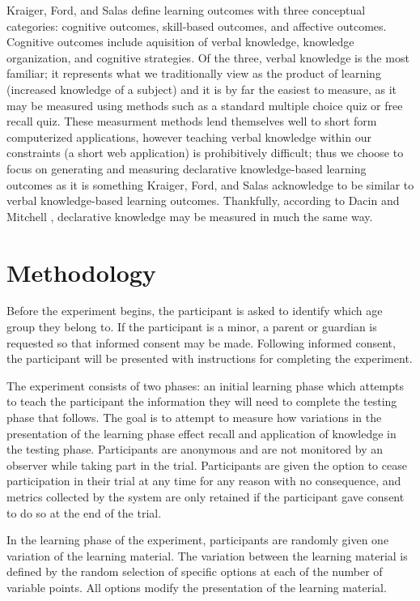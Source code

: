 \documentclass[12pt]{report}
\begin{document}
Kraiger, Ford, and Salas \cite{kraiger1993application} define learning outcomes with three conceptual categories: cognitive outcomes, skill-based outcomes, and affective outcomes. Cognitive outcomes include aquisition of verbal knowledge, knowledge organization, and cognitive strategies. Of the three, verbal knowledge is the most familiar; it represents what we traditionally view as the product of learning (increased knowledge of a subject) and it is by far the easiest to measure, as it may be measured using methods such as a standard multiple choice quiz or free recall quiz. These measurment methods lend themselves well to short form computerized applications, however teaching verbal knowledge within our constraints (a short web application) is prohibitively difficult; thus we choose to focus on generating and measuring declarative knowledge-based learning outcomes as it is something Kraiger, Ford, and Salas acknowledge to be similar to verbal knowledge-based learning outcomes. Thankfully, according to Dacin and Mitchell \cite{dacin1986measurement}, declarative knowledge may be measured in much the same way.

\chapter{Methodology}
\label{ch:Methodology}

Before the experiment begins, the participant is asked to identify which age group they belong to. If the participant is a minor, a parent or guardian is requested so that informed consent may be made. Following informed consent, the participant will be presented with instructions for completing the experiment.

The experiment consists of two phases: an initial learning phase which attempts to teach the participant the information they will need to complete the testing phase that follows. The goal is to attempt to measure how variations in the presentation of the learning phase effect recall and application of knowledge in the testing phase. Participants are anonymous and are not monitored by an observer while taking part in the trial. Participants are given the option to cease participation in their trial at any time for any reason with no consequence, and metrics collected by the system are only retained if the participant gave consent to do so at the end of the trial.

In the learning phase of the experiment, participants are randomly given one variation of the learning material. The variation between the learning material is defined by the random selection of specific options at each of the number of variable points. All options modify the presentation of the learning material.
\end{document}
